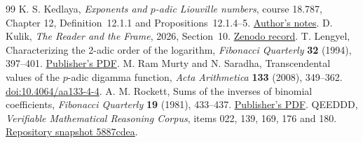 \documentclass[11pt]{article}
\begin{document}
{\begin{thebibliography}{99}
 K. S. Kedlaya, \emph{Exponents and $p$-adic Liouville numbers}, course 18.787, Chapter 12, Definition~12.1.1 and Propositions~12.1.4--5. \href{https://kskedlaya.org/18.787/exponents.pdf}{Author's notes}.
 D. Kulik, \emph{The Reader and the Frame}, 2026, Section~10. \href{https://doi.org/10.5281/zenodo.22007472}{Zenodo record}.
 T. Lengyel, Characterizing the 2-adic order of the logarithm, \emph{Fibonacci Quarterly} \textbf{32} (1994), 397--401. \href{https://www.fq.math.ca/Scanned/32-5/lengyel.pdf}{Publisher's PDF}.
 M. Ram Murty and N. Saradha, Transcendental values of the $p$-adic digamma function, \emph{Acta Arithmetica} \textbf{133} (2008), 349--362. \href{https://doi.org/10.4064/aa133-4-4}{doi:10.4064/aa133-4-4}.
 A. M. Rockett, Sums of the inverses of binomial coefficients, \emph{Fibonacci Quarterly} \textbf{19} (1981), 433--437. \href{https://www.fq.math.ca/Scanned/19-5/rockett.pdf}{Publisher's PDF}.
 QEEDDD, \emph{Verifiable Mathematical Reasoning Corpus}, items 022, 139, 169, 176 and 180. \href{https://github.com/QEEDDD/Verifiable-Mathematical-Reasoning-Corpus/tree/5887cdea4898f0a3aa5bf7a8e0829697bd2b0f4b}{Repository snapshot 5887cdea}.
\end{thebibliography}}
\end{document}

